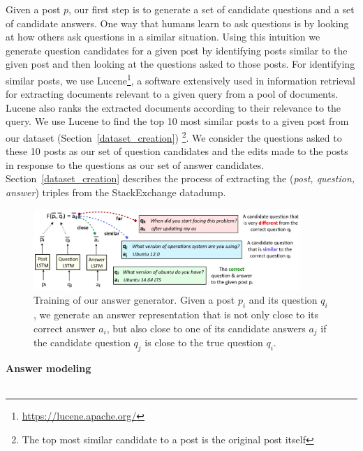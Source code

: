 \documentclass[11pt]{article}
\begin{document}
Given a post $p$, our first step is to generate a set of candidate questions and a set of candidate answers. One way that humans learn to ask questions is by looking at how others ask questions in a similar situation. Using this intuition we generate question candidates for a given post by identifying posts similar to the given post and then looking at the questions asked to those posts. For identifying similar posts, we use Lucene\footnote{\url{https://lucene.apache.org/}}, a software extensively used in information retrieval for extracting documents relevant to a given query from a pool of documents. Lucene also ranks the extracted documents according to their relevance to the query. We use Lucene to find the top 10 most similar posts to a given post from our dataset (Section~\ref{dataset_creation}) \footnote{The top most similar candidate to a post is the original post itself}. We consider the questions asked to these 10 posts as our set of question candidates and the edits made to the posts in response to the questions as our set of answer candidates. Section~\ref{dataset_creation} describes the process of extracting the (\textit{post, question, answer}) triples from the StackExchange datadump. 

\begin{figure}[ht]
\centering
\includegraphics[width=0.9\textwidth]{answer_generator}
\caption{Training of our answer generator. Given a post $p_i$ and its question $q_i$, we generate an answer representation that is not only close to its correct answer $a_i$, but also close to one of its candidate answers $a_j$ if the candidate question $q_j$ is close to the true question $q_i$.}
\label{fig_answer_generator}
\end{figure}

\textbf{Answer modeling}\label{answer_modeling}\\\\
\end{document}
